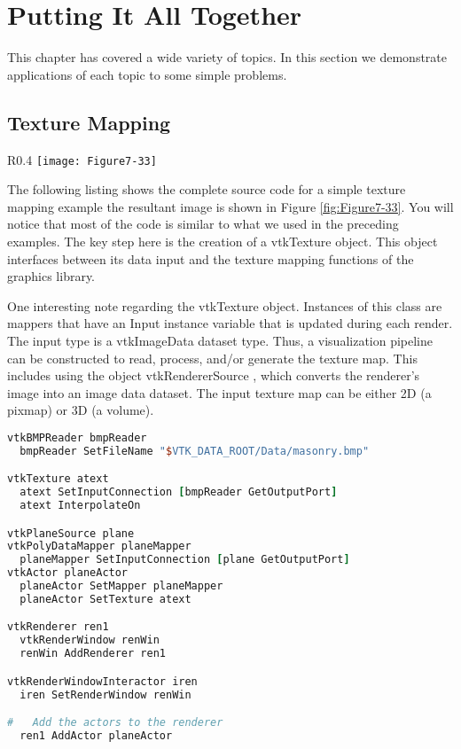 \section{Putting It All Together}

This chapter has covered a wide variety of topics. In this section we demonstrate applications of each topic to some simple problems.

\subsection{Texture Mapping}

\begin{wrapfigure}{R}{0.4\textwidth}
	\centering
	\texttt{[image: Figure7-33]}
	\caption{Example of texture mapping.(\href{https://lorensen.github.io/VTKExamples/site/Cxx/Texture/TexturePlane/}{TexturePlane.cxx}) or (\href{https://lorensen.github.io/VTKExamples/site/Python/Texture/TexturePlane/}{TexturePlane.py})}
	\label{fig:Figure7-33}
\end{wrapfigure}

The following listing shows the complete source code for a simple texture mapping example the resultant image is shown in Figure \ref{fig:Figure7-33}. You will notice that most of the code is similar to what we used in the preceding examples. The key step here is the creation of a vtkTexture object. This object interfaces between its data input and the texture mapping functions of the graphics library.

One interesting note regarding the vtkTexture object. Instances of this class are mappers that have an Input instance variable that is updated during each render. The input type is a vtkImageData dataset type. Thus, a visualization pipeline can be constructed to read, process, and/or generate the texture map. This includes using the object vtkRendererSource , which converts the renderer's image into an image data dataset. The input texture map can be either 2D (a pixmap) or 3D (a volume).

\begin{lstlisting}[language=TCL, caption={Example of texture mapping.}]
vtkBMPReader bmpReader
  bmpReader SetFileName "$VTK_DATA_ROOT/Data/masonry.bmp"

vtkTexture atext
  atext SetInputConnection [bmpReader GetOutputPort]
  atext InterpolateOn

vtkPlaneSource plane
vtkPolyDataMapper planeMapper
  planeMapper SetInputConnection [plane GetOutputPort]
vtkActor planeActor
  planeActor SetMapper planeMapper
  planeActor SetTexture atext

vtkRenderer ren1
  vtkRenderWindow renWin
  renWin AddRenderer ren1

vtkRenderWindowInteractor iren
  iren SetRenderWindow renWin

#   Add the actors to the renderer
  ren1 AddActor planeActor
\end{lstlisting}

